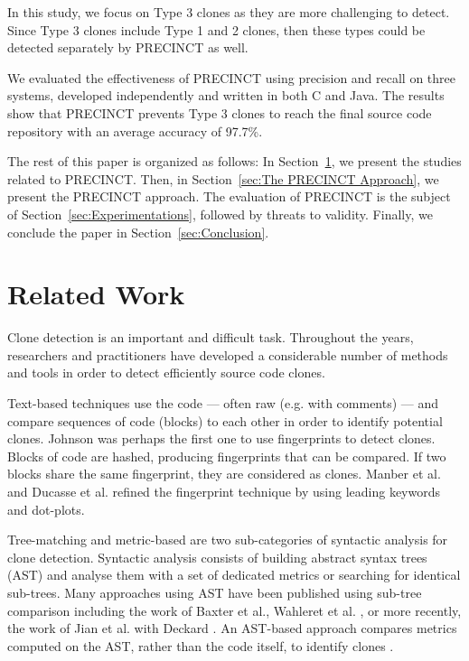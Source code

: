 \documentclass[conference]{IEEEtran}
\begin{document}
In this study, we focus on Type 3 clones as they are more challenging to detect. Since Type 3 clones include Type 1 and 2 clones, then these types could be detected separately by PRECINCT as well. 

We evaluated the effectiveness of PRECINCT using precision and recall on three systems, developed independently and written in both C and Java. The results show that PRECINCT prevents Type 3 clones to reach the final source code repository with an average accuracy of 97.7\%.

The rest of this paper is organized as follows: In Section~\ref{sec:Related Work}, we present the studies related to PRECINCT. Then, in Section~\ref{sec:The PRECINCT Approach}, we present the PRECINCT approach. The evaluation of PRECINCT is the subject of  Section~\ref{sec:Experimentations}, followed by threats to validity.
Finally, we conclude the paper in Section~\ref{sec:Conclusion}.

\section{Related Work}
\label{sec:Related Work}

Clone detection is an important and difficult task. Throughout the years, researchers and practitioners have developed a considerable number of methods and tools in order to detect efficiently source code clones.

Text-based techniques use the code --- often raw (e.g. with comments) --- and compare sequences of code (blocks) to each other in order to identify potential clones. Johnson was perhaps the first one to use fingerprints to detect clones\cite{Johnson1993,Johnson1994}. Blocks of code are hashed, producing fingerprints that can be compared.
If two blocks share the same fingerprint, they are considered as clones.
Manber et al. \cite{Manber1994} and Ducasse et al.\cite{Ducasse1999} refined the fingerprint technique by using leading keywords and dot-plots.

Tree-matching and metric-based are two sub-categories of syntactic analysis for clone detection.
Syntactic analysis consists of building abstract syntax trees (AST) and analyse them with a set of dedicated metrics or searching for identical sub-trees.
Many approaches using AST have been published using sub-tree comparison including the work of Baxter et al.\cite{Baxter1998}, Wahleret et al. \cite{Wahler}, or more recently, the work of Jian et al. with Deckard \cite{Jiang2007}.
An AST-based approach compares metrics computed on the AST, rather than the code itself, to identify clones \cite{Patenaude1999, Balazinska}.
\end{document}
